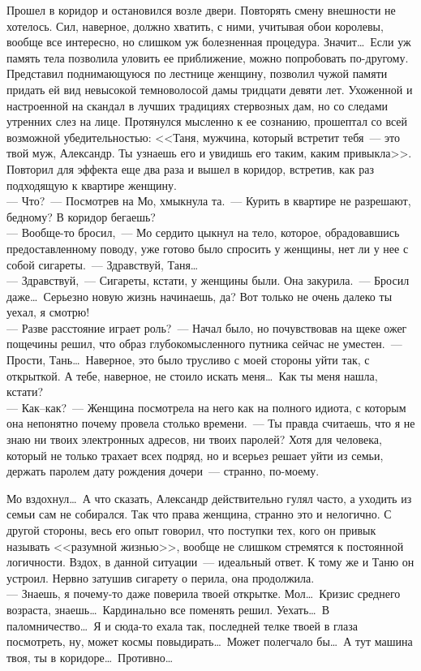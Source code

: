 Прошел в коридор и остановился возле двери. Повторять смену внешности не 
хотелось. Сил, наверное, должно хватить, с ними, учитывая обои королевы, вообще 
все интересно, но слишком уж болезненная процедура. Значит\ldots\ Если уж 
память 
тела позволила уловить ее приближение, можно попробовать по-другому. Представил 
поднимающуюся по лестнице женщину, позволил чужой памяти придать ей вид 
невысокой темноволосой дамы тридцати девяти лет. Ухоженной и настроенной на 
скандал в лучших традициях стервозных дам, но со следами утренних слез на лице. 
Протянулся мысленно к ее сознанию, прошептал со всей возможной убедительностью: 
<<Таня, мужчина, который встретит тебя~--- это твой муж, Александр. Ты узнаешь 
его и увидишь его таким, каким привыкла>>. Повторил для эффекта еще два раза и 
вышел в коридор, встретив, как раз подходящую к квартире женщину.\\
--- Что?~--- Посмотрев на Мо, хмыкнула та.~--- Курить в квартире не разрешают, 
бедному? В коридор бегаешь?\\
--- Вообще-то бросил,~--- Мо сердито цыкнул на тело, которое, обрадовавшись 
предоставленному поводу, уже готово было спросить у женщины, нет ли у нее с 
собой сигареты.~--- Здравствуй, Таня\ldots\\
--- Здравствуй,~--- Сигареты, кстати, у женщины были. Она закурила.~--- Бросил 
даже\ldots\ Серьезно новую жизнь начинаешь, да? Вот только не очень далеко ты 
уехал, я смотрю!\\
--- Разве расстояние играет роль?~--- Начал было, но почувствовав на щеке ожег 
пощечины решил, что образ глубокомысленного путника сейчас не уместен.~--- 
Прости, Тань\ldots\ Наверное, это было трусливо с моей стороны уйти так, с 
открыткой. А тебе, наверное, не стоило искать меня\ldots\ Как ты меня нашла, 
кстати?\\
--- Как--как?~--- Женщина посмотрела на него как на полного идиота, с которым 
она непонятно почему провела столько времени.~--- Ты правда считаешь, что я не 
знаю ни твоих электронных адресов, ни твоих паролей? Хотя для человека, который 
не только трахает всех подряд, но и всерьез решает уйти из семьи, держать 
паролем дату рождения дочери~--- странно, по-моему.

Мо вздохнул\ldots\ А что сказать, Александр действительно гулял часто, а 
уходить из 
семьи сам не собирался. Так что права женщина, странно это и нелогично. С 
другой 
стороны, весь его опыт говорил, что поступки тех, кого он привык называть 
<<разумной жизнью>>, вообще не слишком стремятся к постоянной логичности. 
Вздох, в данной ситуации~--- идеальный ответ. К тому же и Таню он устроил. 
Нервно затушив сигарету о перила, она продолжила.\\
--- Знаешь, я почему-то даже поверила твоей открытке. Мол\ldots\ Кризис 
среднего возраста, знаешь\ldots\ Кардинально все поменять решил. 
Уехать\ldots\ В паломничество\ldots\ Я и сюда-то ехала так, последней телке 
твоей в глаза посмотреть, ну, может космы повыдирать\ldots\ Может полегчало 
бы\ldots\ А тут машина твоя, ты в коридоре\ldots\ Противно\ldots

